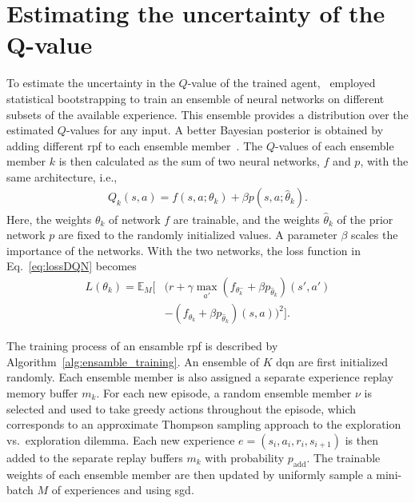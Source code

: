 \section{Estimating the uncertainty of the Q-value}
\label{ch:ensamble}
To estimate the uncertainty in the $Q$-value of the trained agent, \paperEnsamble \ employed statistical bootstrapping to train an ensemble of neural networks on different subsets of the available experience. This ensemble provides a distribution over the estimated $Q$-values for any input. A better Bayesian posterior is obtained by adding different \gls{rpf} to each ensemble member~\cite{Osband2018}.
The $Q$-values of each ensemble member $k$ is then calculated as the sum of two neural networks, $f$ and $p$, with the same architecture, i.e.,
%
\begin{align}
	Q_k(s,a) = f(s,a;\theta_k) + \beta p(s,a;\hat{\theta}_k).
\end{align}
Here, the weights $\theta_k$ of network $f$ are trainable, and the weights $\hat{\theta}_k$ of the prior network $p$ are fixed to the randomly initialized values. A parameter $\beta$ scales the importance of the networks. With the two networks, the loss function in Eq.~\ref{eq:lossDQN} becomes
%
\begin{align}
	\label{eq:loss_boot}
	L(\theta_k) = \mathbb{E}_M \Big[ & (r + \gamma \max_{a'} (f_{\theta^-_k}+\beta p_{\hat{\theta}_k})(s',a') \nonumber \\
	& - (f_{\theta_k}+ \beta p_{\hat{\theta}_k})(s,a) )^2 \Big].
\end{align} 

%

The training process of an ensamble \gls{rpf} is described by Algorithm~\ref{alg:ensamble_training}. 
An ensemble of $K$ \gls{dqn} are first initialized randomly. Each ensemble member is also assigned a separate experience replay memory buffer $m_k$. 
For each new episode, a random ensemble member $\nu$ is selected and used to take greedy actions throughout the episode, which corresponds to an approximate Thompson sampling approach to the exploration vs.~exploration dilemma.
Each new experience $e = (s_i, a_i, r_i, s_{i+1})$ is then added to the separate replay buffers $m_k$ with probability $p_\mathrm{add}$. The trainable weights of each ensemble member are then updated by uniformly sample a mini-batch $M$ of experiences and using \gls{sgd}.

